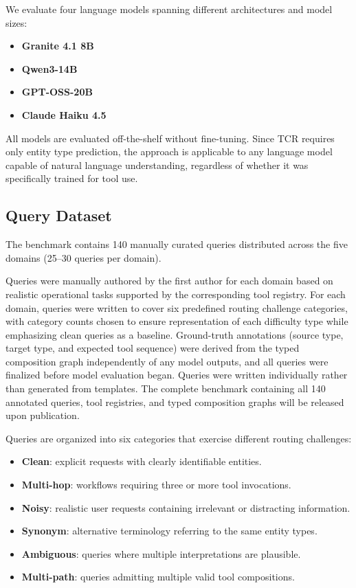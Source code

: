 We evaluate four language models spanning different architectures and model sizes:

\begin{itemize}
    \item \textbf{Granite 4.1 8B}
    \item \textbf{Qwen3-14B}
    \item \textbf{GPT-OSS-20B}
    \item \textbf{Claude Haiku 4.5}
\end{itemize}

All models are evaluated off-the-shelf without fine-tuning.
Since TCR requires only entity type prediction, the approach is applicable to any language model capable of natural language understanding, regardless of whether it was specifically trained for tool use.

\subsection{Query Dataset}
\label{sec:query-categories}

The benchmark contains 140 manually curated queries distributed across the five domains (25--30 queries per domain).

Queries were manually authored by the first author for each domain based on realistic operational tasks supported by the corresponding tool registry.
For each domain, queries were written to cover six predefined routing challenge categories, with category counts chosen to ensure representation of each difficulty type while emphasizing clean queries as a baseline.
Ground-truth annotations (source type, target type, and expected tool sequence) were derived from the typed composition graph independently of any model outputs, and all queries were finalized before model evaluation began.
Queries were written individually rather than generated from templates.
The complete benchmark containing all 140 annotated queries, tool registries, and typed composition graphs will be released upon publication.

Queries are organized into six categories that exercise different routing challenges:

\begin{itemize}
    \item \textbf{Clean}: explicit requests with clearly identifiable entities.
    \item \textbf{Multi-hop}: workflows requiring three or more tool invocations.
    \item \textbf{Noisy}: realistic user requests containing irrelevant or distracting information.
    \item \textbf{Synonym}: alternative terminology referring to the same entity types.
    \item \textbf{Ambiguous}: queries where multiple interpretations are plausible.
    \item \textbf{Multi-path}: queries admitting multiple valid tool compositions.
\end{itemize}

